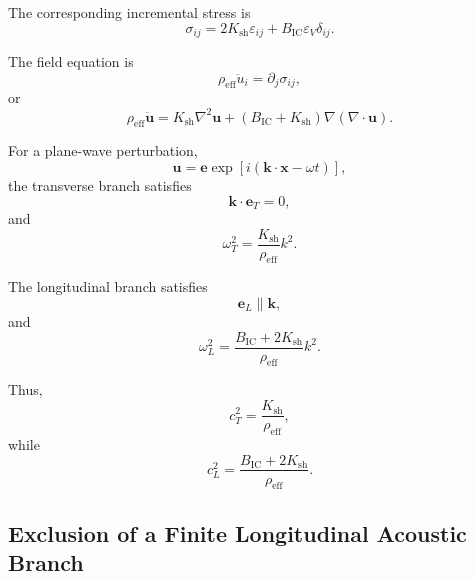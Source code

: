 The corresponding incremental stress is
\begin{equation}
    \boxed{ \sigma_{ij} = 2K_{\mathrm{sh}}\varepsilon_{ij} + B_{\mathrm{IC}} \varepsilon_V\delta_{ij} }.
\end{equation}

The field equation is
\begin{equation}
    \rho_{\mathrm{eff}}\ddot{u}_i = \partial_j\sigma_{ij},
\end{equation}
or
\begin{equation}
    \boxed{ \rho_{\mathrm{eff}}\ddot{\mathbf{u}} = K_{\mathrm{sh}}\nabla^2\mathbf{u} + \left( B_{\mathrm{IC}} + K_{\mathrm{sh}} \right) \nabla \left( \nabla\cdot\mathbf{u} \right) }.
\end{equation}

For a plane-wave perturbation,
\begin{equation}
    \mathbf{u} = \mathbf{e} \exp \left[ i \left( \mathbf{k}\cdot\mathbf{x}-\omega t \right) \right],
\end{equation}
the transverse branch satisfies
\begin{equation}
    \mathbf{k}\cdot\mathbf{e}_T = 0,
\end{equation}
and
\begin{equation}
    \boxed{ \omega_T^2 = \frac{ K_{\mathrm{sh}} }{ \rho_{\mathrm{eff}} } k^2 }.
\end{equation}

The longitudinal branch satisfies
\begin{equation}
    \mathbf{e}_L \parallel \mathbf{k},
\end{equation}
and
\begin{equation}
    \boxed{ \omega_L^2 = \frac{ B_{\mathrm{IC}} + 2K_{\mathrm{sh}} }{ \rho_{\mathrm{eff}} } k^2 }.
\end{equation}

Thus,
\begin{equation}
    c_T^2 = \frac{ K_{\mathrm{sh}} }{ \rho_{\mathrm{eff}} },
\end{equation}
while
\begin{equation}
    c_L^2 = \frac{ B_{\mathrm{IC}} + 2K_{\mathrm{sh}} }{ \rho_{\mathrm{eff}} }.
\end{equation}

\subsection{Exclusion of a Finite Longitudinal Acoustic Branch}

